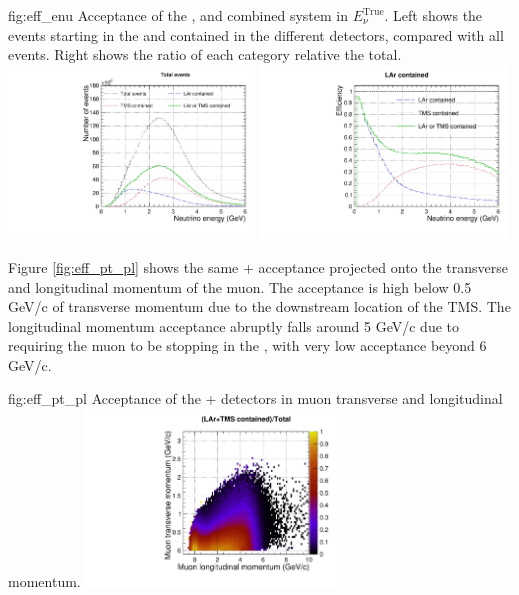 \begin{dunefigure}{fig:eff_enu}
{Acceptance of the ,  and combined system in $E_\nu^\text{True}$. Left shows the events starting in the  and contained in the different detectors, compared with all events. Right shows the ratio of each category relative the total.}
\includegraphics[width=0.49\textwidth, clip, trim={0mm 0mm 0mm 10mm}]{graphics/tms/Simulation/Efficiency/eff.pdf} \includegraphics[width=0.49\textwidth, clip, trim={0mm 0mm 0mm 10mm}]{graphics/tms/Simulation/Efficiency/eff_ratio.pdf}
\end{dunefigure}

Figure \ref{fig:eff_pt_pl} shows the same + acceptance projected onto the transverse and longitudinal momentum of the muon. The acceptance is high below 0.5 GeV/c of transverse momentum due to the downstream location of the TMS. The longitudinal momentum acceptance abruptly falls around 5 GeV/c due to requiring the muon to be stopping in the , with very low acceptance beyond 6 GeV/c.

\begin{dunefigure}{fig:eff_pt_pl}
{Acceptance of the + detectors in muon transverse and longitudinal momentum.}
\includegraphics[width=0.5\textwidth]{graphics/tms/Simulation/LArTMSeff_muonptpl.pdf} 
\end{dunefigure}

